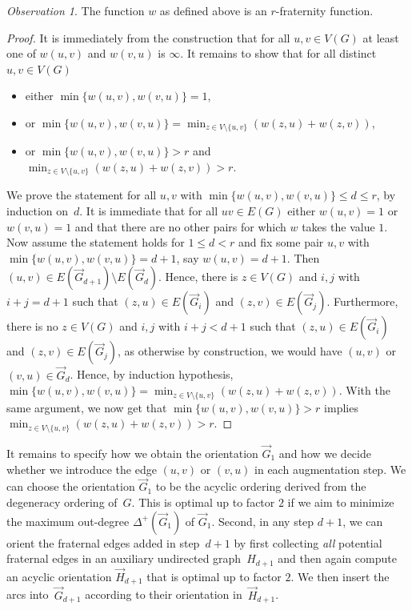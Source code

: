 \documentclass[1p,number,a4paper]{elsarticle}
\theoremstyle{remark}
\newtheorem{observation}[theorem]{Observation}
\begin{document}
\begin{observation}
The function $w$ as defined above is an $r$-fraternity function. 
\end{observation}
\begin{proof}
It is immediately from the construction that for all $u,v\in V(G)$
at least one of $w(u,v)$ and $w(v,u)$ is $\infty$. It remains
to show that for all distinct $u,v\in V(G)$ 

\begin{itemize}
\item either $\min \{w(u,v), w(v,u)\}=1$, 
\item or $\min \{w(u,v), w(v,u)\}=
\min_{z\in V\setminus\{u,v\}} (w(z,u)+w(z,v))$, 
\item or $\min \{w(u,v), w(v,u)\}>r$ and 
$\min_{z\in V\setminus\{u,v\}} (w(z,u)+w(z,v))>r$.  
\end{itemize}

We prove the statement for all $u,v$ with $\min \{w(u,v), w(v,u)\}\leq d\leq r$, by induction on~$d$. 
It is immediate that for all $uv\in E(G)$ either $w(u,v)=1$ 
or $w(v,u)=1$ and that there are no other pairs for which 
$w$ takes the value $1$. Now assume the statement holds for
$1\leq d<r$ and fix some pair $u,v$ with $\min\{w(u,v), w(v,u)\}
=d+1$, say $w(u,v)=d+1$. Then $(u,v)\in E(\vec G_{d+1})\setminus
E(\vec G_d)$. Hence, there is $z\in V(G)$ and $i,j$ with 
$i+j=d+1$ such that $(z,u)\in E(\vec{G}_i)$ and 
$(z,v)\in E(\vec G_j)$. Furthermore, there is no $z\in V(G)$ 
and $i,j$ with 
$i+j<d+1$ such that $(z,u)\in E(\vec{G}_i)$ and 
$(z,v)\in E(\vec G_j)$, as otherwise by construction, we would
have $(u,v)$ or $(v,u)\in\vec G_d$. Hence, by induction hypothesis,
$\min \{w(u,v), w(v,u)\}=
\min_{z\in V\setminus\{u,v\}} (w(z,u)+w(z,v))$. With the 
same argument, we now get that $\min \{w(u,v), w(v,u)\}>r$ implies 
$\min_{z\in V\setminus\{u,v\}} (w(z,u)+w(z,v))>r$.  
\end{proof}

It remains to specify how we obtain the orientation $\vec G_1$ 
and how we decide whether we introduce the 
edge $(u,v)$ or $(v,u)$ in each augmentation step. 
We can choose the orientation $\vec G_1$ to be the
acyclic ordering derived from the degeneracy ordering of~$G$. 
This is optimal up to factor $2$ if we aim to minimize 
the maximum out-degree $\Delta^+(\vec G_1)$ 
of $\vec G_1$. Second, in any step $d+1$, we
can orient the fraternal edges added in step~$d+1$ by 
first collecting \emph{all} potential
fraternal edges in an auxiliary undirected graph~$H_{d+1}$ and 
then again compute an acyclic orientation $\vec H_{d+1}$ 
that is optimal up to factor $2$. We then insert the arcs 
into~$\vec G_{d+1}$ according to their orientation
in~$\vec H_{d+1}$.
\end{document}
